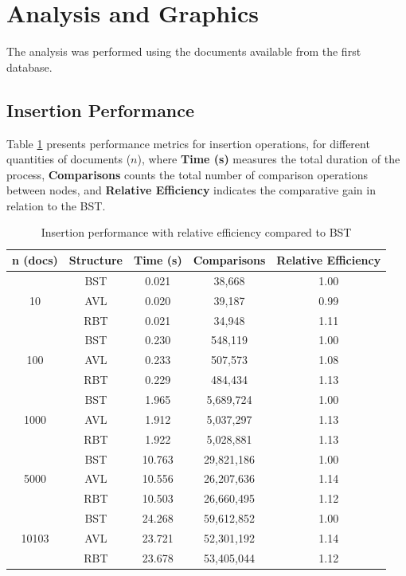 \section{Analysis and Graphics}

The analysis was performed using the documents available from the first database.

\subsection{Insertion Performance}

Table \ref{tab:insercao_completa} presents performance metrics for insertion operations,
for different quantities of documents ($n$), where \textbf{Time (s)} measures the total duration of the process, \textbf{Comparisons} counts the total number
of comparison operations between nodes, and \textbf{Relative Efficiency} indicates the comparative gain
in relation to the BST.

\begin{table}[H]
    \centering
    \begin{tabular}{|c|c|c|c|c|}
    \hline
    \textbf{n (docs)} & \textbf{Structure} & \textbf{Time (s)} & \textbf{Comparisons} & \textbf{Relative Efficiency} \\
    \hline
    \multirow{3}{*}{10} & BST & 0.021 & 38,668 & 1.00 \\
    & AVL & 0.020 & 39,187 & 0.99 \\
    & RBT & 0.021 & 34,948 & 1.11 \\
    \hline
    \multirow{3}{*}{100} & BST & 0.230 & 548,119 & 1.00 \\
    & AVL & 0.233 & 507,573 & 1.08 \\
    & RBT & 0.229 & 484,434 & 1.13 \\
    \hline
    \multirow{3}{*}{1000} & BST & 1.965 & 5,689,724 & 1.00 \\
    & AVL & 1.912 & 5,037,297 & 1.13 \\
    & RBT & 1.922 & 5,028,881 & 1.13 \\
    \hline
    \multirow{3}{*}{5000} & BST & 10.763 & 29,821,186 & 1.00 \\
    & AVL & 10.556 & 26,207,636 & 1.14 \\
    & RBT & 10.503 & 26,660,495 & 1.12 \\
    \hline
    \multirow{3}{*}{10103} & BST & 24.268 & 59,612,852 & 1.00 \\
    & AVL & 23.721 & 52,301,192 & 1.14 \\
    & RBT & 23.678 & 53,405,044 & 1.12 \\
    \hline
    \end{tabular}
    \caption{Insertion performance with relative efficiency compared to BST}
    \label{tab:insercao_completa}
\end{table}

